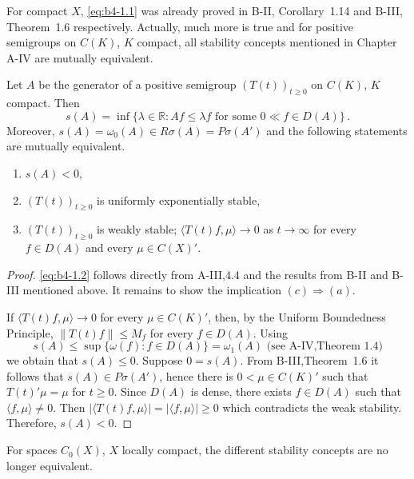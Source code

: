 For compact $X$, \eqref{eq:b4-1.1} was already proved in B-II, Corollary~1.14 and B-III, Theorem~1.6 respectively. 
Actually, much more is true and for positive semigroups on $C(K)$, $K$ compact, all stability concepts mentioned in Chapter A-IV are mutually equivalent.

\begin{theorem}\label{thm:b4-1.1}
Let $A$ be the generator of a positive semigroup $(T(t))_{t \geq 0}$ on $C(K)$, $K$ compact. Then
\begin{equation}\label{eq:b4-1.2}
   s(A) = \inf \{\lambda \in \mathbb{R} \colon Af \leq \lambda f \text{ for some } 0 \ll f \in D(A)\}\,.
\end{equation}
Moreover, $s(A) = \omega_{0}(A) \in R\sigma(A) = P\sigma(A')$ and the following statements are mutually equivalent.
\begin{enumerate}[\upshape (a)]
\item $s(A) < 0$,
\item $(T(t))_{t \geq 0}$ is uniformly exponentially stable,
\item $(T(t))_{t \geq 0}$ is weakly stable; \ie $\langle T(t)f,\mu \rangle \to 0$ as $t \to \infty$ for every $f \in D(A)$ and every $\mu \in C(X)'$.
\end{enumerate}
\end{theorem}
\begin{proof}
\eqref{eq:b4-1.2} follows directly from A-III,4.4 and the results from B-II and B-III mentioned above. 
It remains to show the implication $(c) \Rightarrow (a)$.

If $\langle T(t)f,\mu \rangle \to 0$ for every $\mu \in C(K)'$, then, by the Uniform Boundedness Principle, $\|T(t)f\| \leq M_f$ for every $f \in D(A)$.
Using 
\[
s(A) \leq \sup \{\omega(f)\colon f \in D(A)\} = \omega_1(A)
\text{ (see A-IV,Theorem~1.4)}
\]
we obtain that $s(A) \leq 0$. 
Suppose $0 = s(A)$. 
From B-III,Theorem~1.6 it follows that $s(A) \in P\sigma(A')$, hence there is $0 < \mu \in C(K)'$ such that $T(t)'\mu = \mu$ for $t \geq 0$. 
Since $D(A)$ is dense, there exists $f \in D(A)$ such that $\langle f,\mu \rangle \neq 0$. 
Then $|\langle T(t)f,\mu \rangle| = |\langle f,\mu \rangle|  \ge  0$ which contradicts the weak stability. Therefore, $s(A) < 0$.
\end{proof}
For spaces $C_{0}(X)$, $X$ locally compact, the different stability concepts are no longer equivalent.

